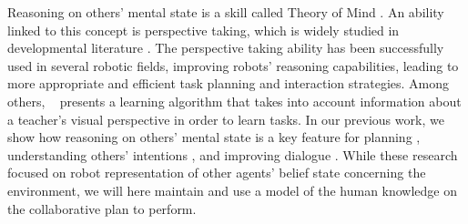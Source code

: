 \documentclass{llncs}
\begin{document}


Reasoning on others' mental state is a skill called Theory of Mind \cite{premack1978does}. An ability linked to this concept is perspective taking, which is widely studied in developmental literature \cite{Tversky1999,Baron1985}. 
The perspective taking ability has been successfully used in several robotic fields, improving robots' reasoning capabilities, leading to more appropriate and efficient task planning and interaction strategies.
Among others, ~\cite{breazeal2006} presents a learning algorithm that takes into account information about a teacher's visual perspective in order to learn tasks.
In our previous work, we show how reasoning on others' mental state is a key feature for planning \cite{guitton2012}, understanding others' intentions \cite{fiore2015}, and improving dialogue \cite{Ferreira2015}. While these research focused on robot representation of other agents' belief state concerning the environment, we will here maintain and use a model of the human knowledge on the collaborative plan to perform.
\end{document}
